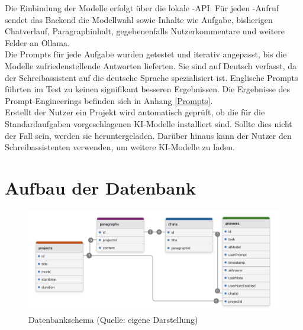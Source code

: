 \documentclass[../main.tex]{subfiles}
\begin{document}
Die Einbindung der Modelle erfolgt über die lokale -API. Für jeden -Aufruf sendet das Backend die Modellwahl sowie Inhalte wie Aufgabe, bisherigen Chatverlauf, 
Paragraphinhalt, gegebenenfalls Nutzerkommentare und weitere Felder an Ollama.\\ Die Prompts für jede Aufgabe wurden getestet und iterativ angepasst, bis die Modelle zufriedenstellende Antworten 
lieferten. Sie sind auf Deutsch verfasst, da der Schreibassistent auf die deutsche Sprache spezialisiert ist. Englische Prompts führten im Test zu keinen signifikant besseren Ergebnissen. Die Ergebnisse des Prompt-Engineerings befinden sich in Anhang \ref{Prompts}.\\
Erstellt der Nutzer ein Projekt wird automatisch geprüft, ob die für die Standardaufgaben vorgeschlagenen KI-Modelle installiert sind. Sollte dies nicht der Fall sein, werden sie heruntergeladen.
Darüber hinaus kann der Nutzer den Schreibassistenten verwenden, um weitere KI-Modelle zu laden. 

\section{Aufbau der Datenbank}
\begin{figure}[h!]
  \includegraphics[scale=0.14]{bilder/Datenbank.png}
  \caption{Datenbankschema (Quelle: eigene Darstellung)}
  \label{fig:data}
\end{figure}
\end{document}
